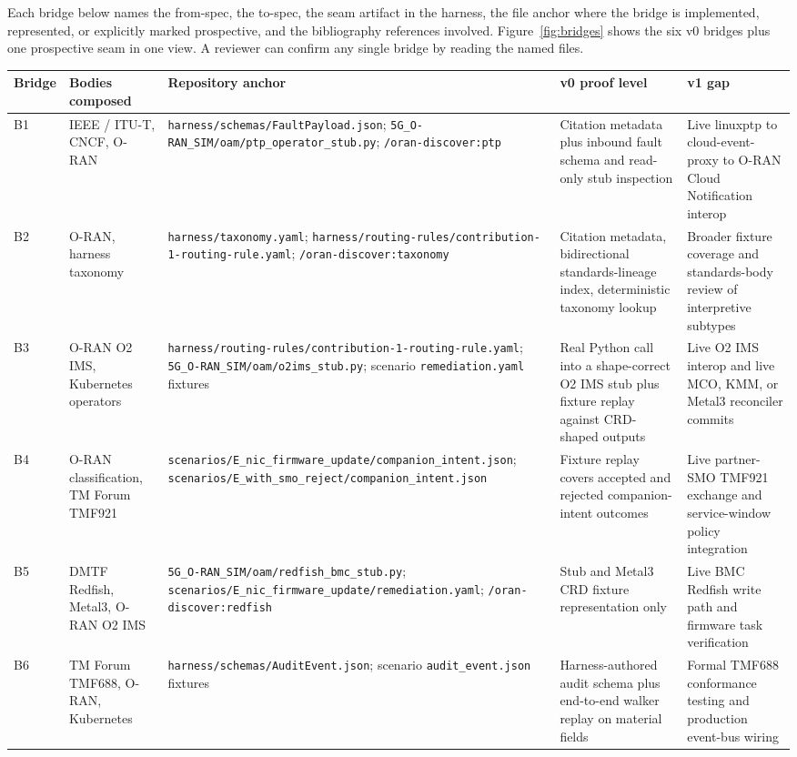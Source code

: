 \documentclass[twocolumn,10pt,a4paper]{article}
\begin{document}
Each bridge below names the from-spec, the to-spec, the seam artifact in the harness, the file anchor where the bridge is implemented, represented, or explicitly marked prospective, and the bibliography references involved. Figure~\ref{fig:bridges} shows the six v0 bridges plus one prospective seam in one view. A reviewer can confirm any single bridge by reading the named files.

\begin{table}[t]
\centering
\scriptsize
\begin{tabularx}{\textwidth}{p{0.75cm}p{2.2cm}X p{2.5cm}X}
\toprule
Bridge & Bodies composed & Repository anchor & v0 proof level & v1 gap \\
\midrule
B1 & IEEE / ITU-T, CNCF, O-RAN & \texttt{harness/schemas/FaultPayload.json}; \texttt{5G\_O-RAN\_SIM/oam/ptp\_operator\_stub.py}; \texttt{/oran-discover:ptp} & Citation metadata plus inbound fault schema and read-only stub inspection & Live linuxptp to cloud-event-proxy to O-RAN Cloud Notification interop \\
B2 & O-RAN, harness taxonomy & \texttt{harness/taxonomy.yaml}; \texttt{harness/routing-rules/contribution-1-routing-rule.yaml}; \texttt{/oran-discover:taxonomy} & Citation metadata, bidirectional standards-lineage index, deterministic taxonomy lookup & Broader fixture coverage and standards-body review of interpretive subtypes \\
B3 & O-RAN O2 IMS, Kubernetes operators & \texttt{harness/routing-rules/contribution-1-routing-rule.yaml}; \texttt{5G\_O-RAN\_SIM/oam/o2ims\_stub.py}; scenario \texttt{remediation.yaml} fixtures & Real Python call into a shape-correct O2 IMS stub plus fixture replay against CRD-shaped outputs & Live O2 IMS interop and live MCO, KMM, or Metal3 reconciler commits \\
B4 & O-RAN classification, TM Forum TMF921 & \texttt{scenarios/E\_nic\_firmware\_update/companion\_intent.json}; \texttt{scenarios/E\_with\_smo\_reject/companion\_intent.json} & Fixture replay covers accepted and rejected companion-intent outcomes & Live partner-SMO TMF921 exchange and service-window policy integration \\
B5 & DMTF Redfish, Metal3, O-RAN O2 IMS & \texttt{5G\_O-RAN\_SIM/oam/redfish\_bmc\_stub.py}; \texttt{scenarios/E\_nic\_firmware\_update/remediation.yaml}; \texttt{/oran-discover:redfish} & Stub and Metal3 CRD fixture representation only & Live BMC Redfish write path and firmware task verification \\
B6 & TM Forum TMF688, O-RAN, Kubernetes & \texttt{harness/schemas/AuditEvent.json}; scenario \texttt{audit\_event.json} fixtures & Harness-authored audit schema plus end-to-end walker replay on material fields & Formal TMF688 conformance testing and production event-bus wiring \\

\end{tabularx}
\end{table}
\end{document}
